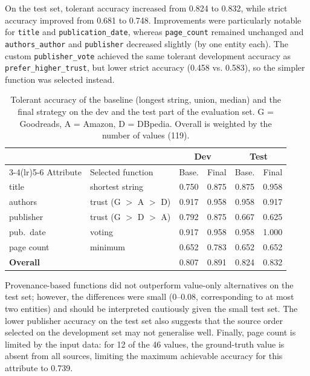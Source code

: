 \documentclass[runningheads]{llncs}
\begin{document}
On the test set, tolerant accuracy increased from 0.824 to 0.832, while strict accuracy improved from 0.681 to 0.748. Improvements were particularly notable for \texttt{title} and \texttt{publication\_date}, whereas \texttt{page\_count} remained unchanged and \texttt{authors\_author} and \texttt{publisher} decreased slightly (by one entity each). The custom \texttt{publisher\_vote} achieved the same tolerant development accuracy as \texttt{prefer\_higher\_trust}, but lower strict accuracy (0.458 vs. 0.583), so the simpler function was selected instead.

\begin{table}[h]
\caption{Tolerant accuracy of the baseline (longest string, union, median) and the final strategy on the dev and the test part of the evaluation set. G = Goodreads, A = Amazon, D = DBpedia. Overall is weighted by the number of values (119).}
\label{tab:cr-final}
\centering
\footnotesize
\setlength{\tabcolsep}{4pt}
\begin{tabular}{@{}llcccc@{}}
\toprule
 & & \multicolumn{2}{c}{Dev} & \multicolumn{2}{c}{Test} \\
\cmidrule(lr){3-4}\cmidrule(lr){5-6}
Attribute & Selected function & Base. & Final & Base. & Final \\
\midrule
title            & shortest string        & 0.750 & 0.875 & 0.875 & 0.958 \\
authors          & trust (G $>$ A $>$ D)  & 0.917 & 0.958 & 0.958 & 0.917 \\
publisher        & trust (G $>$ D $>$ A)  & 0.792 & 0.875 & 0.667 & 0.625 \\
pub.\ date       & voting                 & 0.917 & 0.958 & 0.958 & 1.000 \\
page count       & minimum                & 0.652 & 0.783 & 0.652 & 0.652 \\
\midrule
\textbf{Overall} &                        & 0.807 & 0.891 & 0.824 & 0.832 \\
\bottomrule
\end{tabular}
\end{table}

Provenance-based functions did not outperform value-only alternatives on the test set; however, the differences were small (0--0.08, corresponding to at most two entities) and should be interpreted cautiously given the small test set. The lower publisher accuracy on the test set also suggests that the source order selected on the development set may not generalise well. Finally, page count is limited by the input data: for 12 of the 46 values, the ground-truth value is absent from all sources, limiting the maximum achievable accuracy for this attribute to 0.739.
\end{document}
